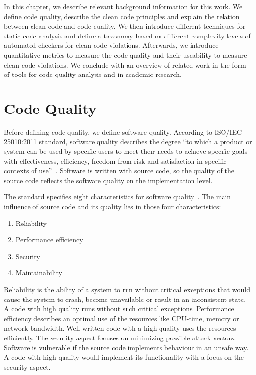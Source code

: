 In this chapter, we describe relevant background information for this work. We define code quality, describe the clean code principles and explain the relation between clean code and code quality. We then introduce different techniques for static code analysis and define a taxonomy based on different complexity levels of automated checkers for clean code violations. Afterwards, we introduce quantitative metrics to measure the code quality and their useability to measure clean code violations. We conclude with an overview of related work in the form of tools for code quality analysis and in academic research.

\section{Code Quality}\label{sec:code_quality}
Before defining code quality, we define software quality. According to ISO/IEC 25010:2011 standard, software quality describes the degree \enquote{to which a product or system can be used by specific users to meet their needs to achieve specific goals with effectiveness, efficiency, freedom from risk and satisfaction in specific contexts of use}~\cite{iso_central_secretary_isoiec_2011-1}. Software is written with source code, so the quality of the source code reflects the software quality on the implementation level. 

The standard specifies eight characteristics for software quality~\cite{iso_central_secretary_isoiec_2011-1}. The main influence of source code and its quality lies in those four characteristics:
\begin{enumerate}
    \item Reliability
    \item Performance efficiency
    \item Security
    \item Maintainability
\end{enumerate}
Reliability is the ability of a system to run without critical exceptions that would cause the system to crash, become unavailable or result in an inconsistent state. A code with high quality runs without such critical exceptions. Performance efficiency describes an optimal use of the resources like CPU-time, memory or network bandwidth. Well written code with a high quality uses the resources efficiently. The security aspect focuses on minimizing possible attack vectors. Software is vulnerable if the source code implements behaviour in an unsafe way. A code with high quality would implement its functionality with a focus on the security aspect. 

